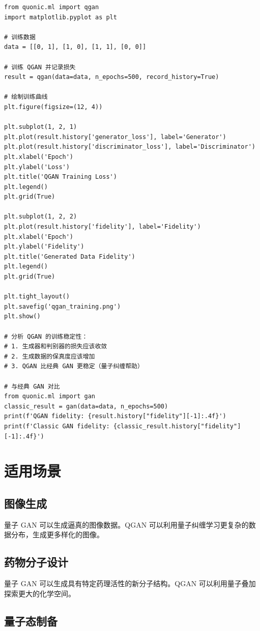 \documentclass[12pt,a4paper]{article}
\begin{document}
\begin{verbatim}
from quonic.ml import qgan
import matplotlib.pyplot as plt

# 训练数据
data = [[0, 1], [1, 0], [1, 1], [0, 0]]

# 训练 QGAN 并记录损失
result = qgan(data=data, n_epochs=500, record_history=True)

# 绘制训练曲线
plt.figure(figsize=(12, 4))

plt.subplot(1, 2, 1)
plt.plot(result.history['generator_loss'], label='Generator')
plt.plot(result.history['discriminator_loss'], label='Discriminator')
plt.xlabel('Epoch')
plt.ylabel('Loss')
plt.title('QGAN Training Loss')
plt.legend()
plt.grid(True)

plt.subplot(1, 2, 2)
plt.plot(result.history['fidelity'], label='Fidelity')
plt.xlabel('Epoch')
plt.ylabel('Fidelity')
plt.title('Generated Data Fidelity')
plt.legend()
plt.grid(True)

plt.tight_layout()
plt.savefig('qgan_training.png')
plt.show()

# 分析 QGAN 的训练稳定性：
# 1. 生成器和判别器的损失应该收敛
# 2. 生成数据的保真度应该增加
# 3. QGAN 比经典 GAN 更稳定（量子纠缠帮助）

# 与经典 GAN 对比
from quonic.ml import gan
classic_result = gan(data=data, n_epochs=500)
print(f'QGAN fidelity: {result.history["fidelity"][-1]:.4f}')
print(f'Classic GAN fidelity: {classic_result.history["fidelity"][-1]:.4f}')
\end{verbatim}

\section{适用场景}

\subsection{图像生成}

量子 GAN 可以生成逼真的图像数据。QGAN 可以利用量子纠缠学习更复杂的数据分布，生成更多样化的图像。

\subsection{药物分子设计}

量子 GAN 可以生成具有特定药理活性的新分子结构。QGAN 可以利用量子叠加探索更大的化学空间。

\subsection{量子态制备}
\end{document}
